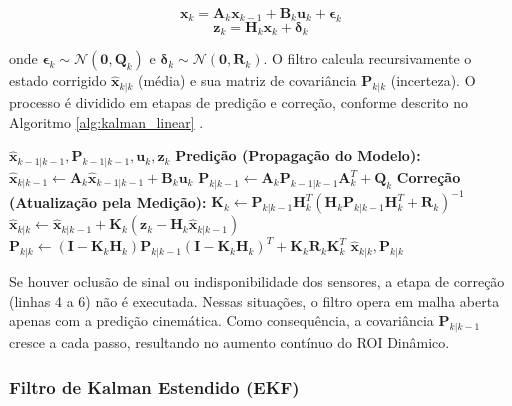 \begin{equation}
    \label{eq:kalman_dinamica}
    \mathbf{x}_k = \mathbf{A}_k \mathbf{x}_{k-1} + \mathbf{B}_k \mathbf{u}_k + \boldsymbol{\epsilon}_k
\end{equation}
\begin{equation}
    \label{eq:kalman_medicao}
    \mathbf{z}_k = \mathbf{H}_k \mathbf{x}_k + \boldsymbol{\delta}_k
\end{equation}

onde $\boldsymbol{\epsilon}_k \sim \mathcal{N}(\mathbf{0}, \mathbf{Q}_k)$ e $\boldsymbol{\delta}_k \sim \mathcal{N}(\mathbf{0}, \mathbf{R}_k)$. O filtro calcula recursivamente o estado corrigido $\hat{\mathbf{x}}_{k|k}$ (média) e sua matriz de covariância $\mathbf{P}_{k|k}$ (incerteza). O processo é dividido em etapas de predição e correção, conforme descrito no Algoritmo \ref{alg:kalman_linear} \cite{thrun2005probabilistic}.

\begin{algorithm}[H]
\caption{Filtro de Kalman Linear}
\label{alg:kalman_linear}
\begin{algorithmic}[1]
\Require $\hat{\mathbf{x}}_{k-1|k-1}, \mathbf{P}_{k-1|k-1}, \mathbf{u}_k, \mathbf{z}_k$
\Statex \textbf{Predição (Propagação do Modelo):}
\State $\hat{\mathbf{x}}_{k|k-1} \gets \mathbf{A}_k \hat{\mathbf{x}}_{k-1|k-1} + \mathbf{B}_k \mathbf{u}_k$
\State $\mathbf{P}_{k|k-1} \gets \mathbf{A}_k \mathbf{P}_{k-1|k-1} \mathbf{A}_k^T + \mathbf{Q}_k$
\Statex \textbf{Correção (Atualização pela Medição):}
\State $\mathbf{K}_k \gets \mathbf{P}_{k|k-1} \mathbf{H}_k^T (\mathbf{H}_k \mathbf{P}_{k|k-1} \mathbf{H}_k^T + \mathbf{R}_k)^{-1}$
\State $\hat{\mathbf{x}}_{k|k} \gets \hat{\mathbf{x}}_{k|k-1} + \mathbf{K}_k (\mathbf{z}_k - \mathbf{H}_k \hat{\mathbf{x}}_{k|k-1})$
\State $\mathbf{P}_{k|k} \gets (\mathbf{I} - \mathbf{K}_k \mathbf{H}_k) \mathbf{P}_{k|k-1} (\mathbf{I} - \mathbf{K}_k \mathbf{H}_k)^T + \mathbf{K}_k \mathbf{R}_k \mathbf{K}_k^T$
\Ensure $\hat{\mathbf{x}}_{k|k}, \mathbf{P}_{k|k}$
\end{algorithmic}
\end{algorithm}

Se houver oclusão de sinal ou indisponibilidade dos sensores, a etapa de correção (linhas 4 a 6) não é executada. Nessas situações, o filtro opera em malha aberta apenas com a predição cinemática. Como consequência, a covariância $\mathbf{P}_{k|k-1}$ cresce a cada passo, resultando no aumento contínuo do ROI Dinâmico.

\subsubsection{Filtro de Kalman Estendido (EKF)}
\label{subsubsec:KalmanExtended}

